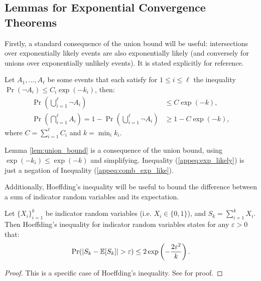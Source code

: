 \subsection{Lemmas for Exponential Convergence Theorems}
\label{appsec:exp-prelim}

    Firstly, a standard consequence of the union bound will be useful: intersections over exponentially likely events are also exponentially likely (and conversely for unions over exponentially unlikely events). It is stated explicitly for reference.
    \begin{lemma} 
    \label{lem:union_bound}
        Let $A_1,...,A_{\ell}$ be some events that each satisfy for $1\leq i \leq \ell$ the inequality $\Pr(\lnot A_i) \leq C_i\exp(-k_i)$, then:
        \begin{align}
            \Pr\left(\bigcup_{i=1}^\ell \lnot A_i\right) &\leq C\exp(-k), \label{appeq:comb_exp_like} \\
            \Pr\left(\bigcap_{i=1}^\ell A_i\right) = 1-\Pr\left(\bigcup_{i=1}^\ell \lnot A_i\right) &\geq 1-C\exp(-k), \label{appeq:exp_likely}
        \end{align}
        where $C=\sum_{i=1}^\ell C_i$ and $k = \min_i k_i$.
    \end{lemma}
    \begin{proofoutline}
        Lemma \ref{lem:union_bound} is a consequence of the union bound, using $\exp(-k_i)\leq\exp(-k)$ and simplifying. Inequality (\ref{appeq:exp_likely}) is just a negation of Inequality (\ref{appeq:comb_exp_like}).
    \end{proofoutline}

    \proofsep




    Additionally, Hoeffding's inequality will be useful to bound the difference between a sum of indicator random variables and its expectation. 
    \begin{theorem} \label{thrm:hoeffding}
        Let $\{X_i\}_{i=1}^k$ be indicator random variables (i.e. $X_i\in\{0,1\}$), and $S_k=\sum_{i=1}^k X_i$. Then Hoeffding's inequality for indicator random variables states for any $\varepsilon > 0$ that:
        \begin{align}
            \Pr(|S_k - \bb{E}[S_k]|>\varepsilon)\leq 2\exp\left(-\frac{2\varepsilon^2}{k}\right).
        \end{align}
    \end{theorem}
    \begin{proof}
        This is a specific case of Hoeffding's inequality. See \cite{hoeffding} for proof.
    \end{proof}





